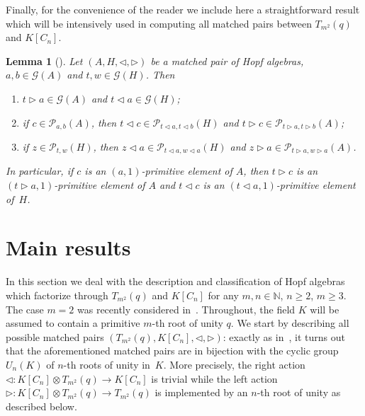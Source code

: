 \documentclass[10pt,a4paper]{amsart}
\numberwithin{equation}{section}
\newtheorem{Lemma}[Theorem]{Lemma}
\begin{document}
Finally, for the convenience of the reader we include here a straightforward result which will be intensively used in computing all matched pairs between $T_{m^{2}}(q)$ and $K[C_{n}]$.
\begin{Lemma}[{\cite[Lemma 4.1]{abm}}]\label{primitive}
Let $(A, H, \triangleleft, \triangleright)$ be a matched pair of Hopf algebras, $a, b \in \mathcal{G}(A)$ and $t, w\in \mathcal{G}(H)$. Then
\begin{enumerate}\itemsep=0pt
\item[$(1)$] $t \triangleright a \in \mathcal{G}(A)$ and $t\triangleleft a \in \mathcal{G}(H)$;

\item[$(2)$] if $c \in \mathcal{P}_{a, b}(A)$, then $t \triangleleft c \in \mathcal{P}_{t\triangleleft a, t\triangleleft b} (H)$ and
$t \triangleright c \in \mathcal{P}_{t\triangleright a, t\triangleright b} (A)$;

\item[$(3)$] if $z \in \mathcal{P}_{t, w}(H)$, then $z \triangleleft a \in \mathcal{P}_{t\triangleleft a, w\triangleleft a} (H)$ and $z \triangleright a \in \mathcal{P}_{t\triangleright a, w\triangleright a} (A)$.
\end{enumerate}
In particular, if $c$ is an $(a, 1)$-primitive element of $A$, then $t \triangleright c$ is an $(t\triangleright a, 1)$-primitive element of $A$ and $t \triangleleft c$ is an $(t\triangleleft a, 1)$-primitive element of~$H$.
\end{Lemma}

\section{Main results}\label{2}

In this section we deal with the description and classification of Hopf algebras which factorize through $T_{m^{2}}(q)$ and $K[C_{n}]$ for any $m, n \in \mathbb{N}$, $n \geqslant 2$, $m \geqslant 3$. The case $m = 2$ was recently considered in~\cite{abm}. Throughout, the field $K$ will be assumed to contain a primitive $m$-th root of unity $q$. We start by describing all possible matched pairs $(T_{m^{2}}(q), K[C_n], \triangleleft,
\triangleright)$: exactly as in~\cite{abm}, it turns out that the aforementioned matched pairs are in bijection with the cyclic group~$U_n (K)$ of
$n$-th roots of unity in~$K$. More precisely, the right action $\triangleleft \colon K[C_{n}] \otimes T_{m^{2}}(q) \to K[C_{n}]$ is trivial while
the left action $\triangleright \colon K[C_{n}] \otimes T_{m^{2}}(q) \to T_{m^{2}}(q)$ is implemented by an $n$-th root of unity as described below.
\end{document}
